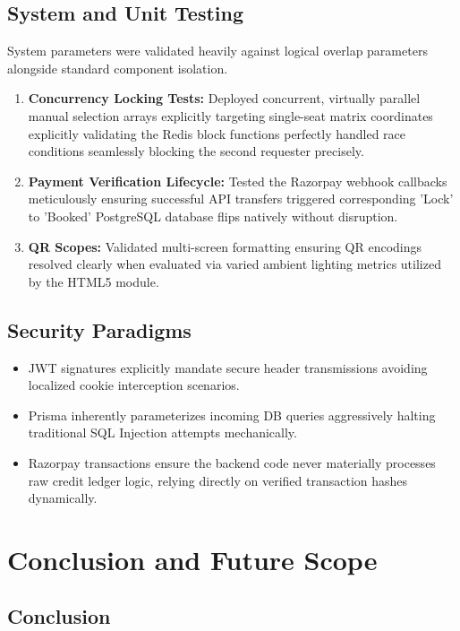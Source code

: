\documentclass[12pt,a4paper]{report}
\begin{document}
\section{System and Unit Testing}
System parameters were validated heavily against logical overlap parameters alongside standard component isolation.
\begin{enumerate}
    \item \textbf{Concurrency Locking Tests:} Deployed concurrent, virtually parallel manual selection arrays explicitly targeting single-seat matrix coordinates explicitly validating the Redis block functions perfectly handled race conditions seamlessly blocking the second requester precisely.
    \item \textbf{Payment Verification Lifecycle:} Tested the Razorpay webhook callbacks meticulously ensuring successful API transfers triggered corresponding 'Lock' to 'Booked' PostgreSQL database flips natively without disruption.
    \item \textbf{QR Scopes:} Validated multi-screen formatting ensuring QR encodings resolved clearly when evaluated via varied ambient lighting metrics utilized by the HTML5 module.
\end{enumerate}

\section{Security Paradigms}
\begin{itemize}
    \item JWT signatures explicitly mandate secure header transmissions avoiding localized cookie interception scenarios.
    \item Prisma inherently parameterizes incoming DB queries aggressively halting traditional SQL Injection attempts mechanically.
    \item Razorpay transactions ensure the backend code never materially processes raw credit ledger logic, relying directly on verified transaction hashes dynamically.
\end{itemize}

\chapter{Conclusion and Future Scope}

\section{Conclusion}
\end{document}

